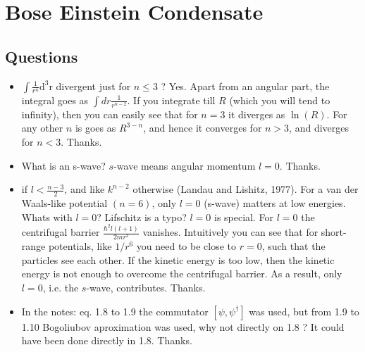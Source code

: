 \section{Bose Einstein Condensate}

\subsection{Questions}
\begin{itemize}
         \item $\int \frac{1}{r^{n}} \mathrm{d^{3}r}$ divergent just for $n \leq 3 $ ?
        {\color{red}
            Yes. Apart from an angular part, the integral goes as $\int dr \frac{1}{r^{n-2}}$. If you integrate  till $R$ (which you will tend to infinity), then you can easily see that for $n=3$ it diverges as
            $\ln(R)$. For any other $n$ is goes as $R^{3-n}$, and hence it converges for $n>3$, and diverges for $n<3$.
        }
        {\color{green} Thanks.}
        
        \item What is an s-wave?
        {\color{red} $s$-wave means angular momentum $l=0$}.
        {\color{green} Thanks.}

        \item if $l < \frac{n-3}{2}$, and like $k^{n-2}$ otherwise (Landau and Lishitz, 1977). For a van der
        Waals-like potential $(n = 6)$, only $l = 0$ (s-wave) matters at low energies. Whats with $l=0$? Lifschitz is a typo?
        {\color{red}
            $l=0$ is special. For $l=0$ the centrifugal barrier $\frac{\hbar^2l(l+1)}{2mr^2}$ vanishes. Intuitively you can see that for short-range potentials, like $1/r^6$ you need to
            be close to $r=0$, such that the particles see each other. If the kinetic energy is too low, then the kinetic energy is not enough to overcome the centrifugal barrier. As a result, only $l=0$, i.e. the $s$-wave,
            contributes.
        }
        {\color{green} Thanks.}

        \item In the notes: eq. 1.8 to 1.9 the commutator $[\psi, \psi^{\dagger}]$ was used, but from 1.9 to 1.10 Bogoliubov aproximation was used, why not directly on 1.8 ?
        {\color{red} It could have been done directly in 1.8.}
        {\color{green} Thanks.}


\end{itemize}
